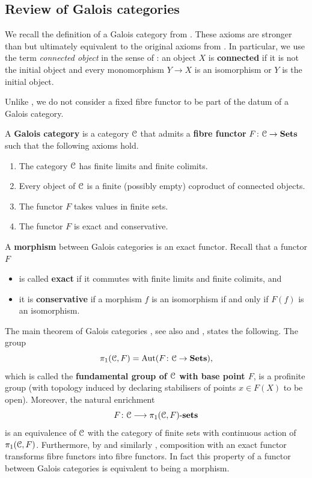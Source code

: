 \subsection{Review of Galois categories}
\label{sec:Gal cats}

We recall the definition of a Galois category from 
.  These axioms are stronger than  but ultimately equivalent to the original axioms from \cite[V, \S4]{SGA1}. In particular, we use the term \emph{connected object} in the sense of : an object $X$ is \textbf{connected}  if it is not the initial object and every monomorphism $Y \to X$ is an isomorphism or $Y$ is the initial object. 

Unlike , we do not consider a fixed fibre functor to be part of the datum of a Galois category.

\begin{defi}
    \label{defi:Gal cat}
    A \textbf{Galois category} is a category ${\mathcal C}$ that admits a \textbf{fibre functor} $F \colon {\mathcal C} \to \mathbf{Sets}$ such that the following axioms hold. 
    \begin{enumerate}[(G\arabic*)]
        \item 
        The category ${\mathcal C}$ has finite limits and finite colimits.
        \item 
        Every object of ${\mathcal C}$ is a finite (possibly empty) coproduct of connected objects. 
        \item 
        The functor $F$ takes values in finite sets.
        \item 
        The functor $F$ is exact 
        and conservative. 
    \end{enumerate}
    A \textbf{morphism} between Galois categories is an exact functor.    
    Recall that a functor $F$
    \begin{itemize}
        \item 
        is called \textbf{exact} if it commutes with finite limits and finite colimits, and 
        \item 
        it is \textbf{conservative} if a morphism $f$ is an isomorphism if and only if $F(f)$ is an isomorphism. 
    \end{itemize} 
\end{defi}

The main theorem of Galois categories \cite[V~Th\'eor\`eme 4.1]{SGA1}, see also  and , states the following. The group
\[
    \pi_1({\mathcal C},F) =  \operatorname{Aut}(F \colon {\mathcal C} \to \mathbf{Sets}),
\]
which is called the \textbf{fundamental group of ${\mathcal C}$ with base point $F$}, 
is a profinite group (with topology induced by declaring stabilisers of points $x \in F(X)$ to be open). Moreover, the natural enrichment
\[
    F \colon {\mathcal C} \longrightarrow \pi_1({\mathcal C},F)\text{-}\mathbf{sets}
\]
is an equivalence of ${\mathcal C}$ with the category of finite sets with continuous action of $\pi_1({\mathcal C},F)$. Furthermore, by \cite[V Proposition~6.1]{SGA1} and similarly , composition with an exact functor transforms fibre functors into fibre functors. In fact this property of a functor between Galois categories is equivalent to being a morphism.

